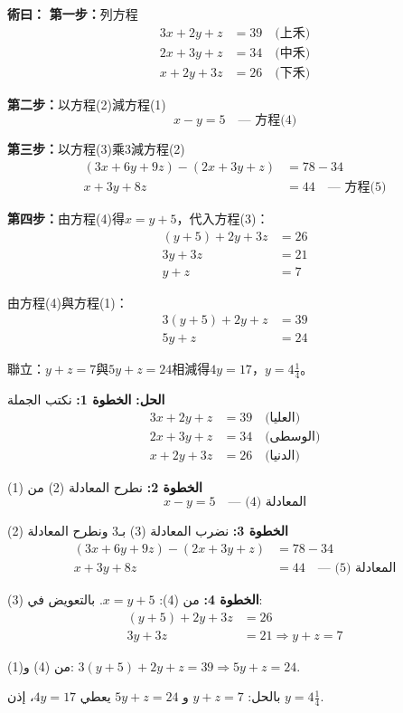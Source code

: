 \documentclass[11pt,a4paper]{article}
\newcommand{\working}[2]{\par\noindent%
  \begin{minipage}[t]{0.48\textwidth}\textbf{術曰：}#1\end{minipage}%
  \hfill%
  \begin{minipage}[t]{0.48\textwidth}\arabicfont\beginR\textbf{الحل:} #2\endR\end{minipage}\par\vspace{0.2cm}}
\begin{document}
\working{%
\textbf{第一步：}列方程
\begin{align*}
3x + 2y + z &= 39 \quad \text{(上禾)} \\
2x + 3y + z &= 34 \quad \text{(中禾)} \\
x + 2y + 3z &= 26 \quad \text{(下禾)}
\end{align*}

\textbf{第二步：}以方程(2)減方程(1)
\[ x - y = 5 \quad \text{--- 方程(4)} \]

\textbf{第三步：}以方程(3)乘3減方程(2)
\begin{align*}
(3x + 6y + 9z) - (2x + 3y + z) &= 78 - 34 \\
x + 3y + 8z &= 44 \quad \text{--- 方程(5)}
\end{align*}

\textbf{第四步：}由方程(4)得$x = y + 5$，代入方程(3)：
\begin{align*}
(y + 5) + 2y + 3z &= 26 \\
3y + 3z &= 21 \\
y + z &= 7
\end{align*}

由方程(4)與方程(1)：
\begin{align*}
3(y+5) + 2y + z &= 39 \\
5y + z &= 24
\end{align*}

聯立：$y + z = 7$與$5y + z = 24$相減得$4y = 17$，$y = 4\frac{1}{4}$。%
}{%
\textbf{الخطوة 1:} نكتب الجملة
\begin{align*}
3x + 2y + z &= 39 \quad \text{(العليا)} \\
2x + 3y + z &= 34 \quad \text{(الوسطى)} \\
x + 2y + 3z &= 26 \quad \text{(الدنيا)}
\end{align*}

\textbf{الخطوة 2:} نطرح المعادلة (2) من (1)
\[ x - y = 5 \quad \text{--- المعادلة (4)} \]

\textbf{الخطوة 3:} نضرب المعادلة (3) بـ3 ونطرح المعادلة (2)
\begin{align*}
(3x + 6y + 9z) - (2x + 3y + z) &= 78 - 34 \\
x + 3y + 8z &= 44 \quad \text{--- المعادلة (5)}
\end{align*}

\textbf{الخطوة 4:} من (4): $x = y + 5$. بالتعويض في (3):
\begin{align*}
(y + 5) + 2y + 3z &= 26 \\
3y + 3z &= 21 \Rightarrow y + z = 7
\end{align*}

من (4) و(1): $3(y+5) + 2y + z = 39 \Rightarrow 5y + z = 24$.

بالحل: $y + z = 7$ و $5y + z = 24$ يعطي $4y = 17$، إذن $y = 4\frac{1}{4}$.%
}
\end{document}
